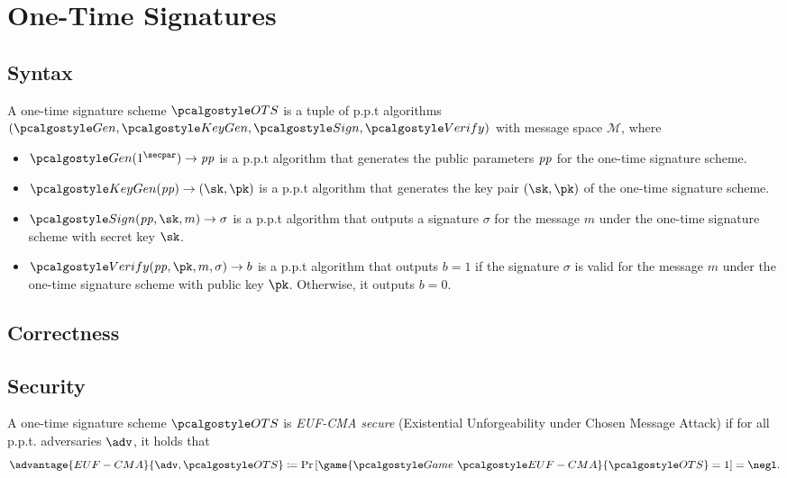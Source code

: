 \section{One-Time Signatures}\label{sec:one-time-sigs}

\subsection{Syntax}

\begin{definition}
    A one-time signature scheme $\algo{OTS}$ is a tuple of p.p.t algorithms $(\algo{Gen}, \algo{KeyGen}, \algo{Sign}, \algo{Verify})$ with message space $\mathcal{M}$, where
    \begin{itemize}
        \item $\algo{Gen}(1^\secpar)\rightarrow \params$ is a p.p.t algorithm that generates the public parameters $\mathit{pp}$ for the one-time signature scheme.
        \item $\algo{KeyGen}(\params)\rightarrow (\sk, \pk)$ is a p.p.t algorithm that generates the key pair $(\sk, \pk)$ of the one-time signature scheme.
        \item $\algo{Sign}(\params, \sk, m) \rightarrow \sigma$ is a p.p.t algorithm that outputs a signature $\sigma$ for the message $m$ under the one-time signature scheme with secret key $\sk$.
        \item $\algo{Verify}(\params, \pk, m, \sigma) \rightarrow b$ is a p.p.t algorithm that outputs $b = 1$ if the signature $\sigma$ is valid for the message $m$ under the one-time signature scheme with public key $\pk$. Otherwise, it outputs $b = 0$.
    \end{itemize}
\end{definition}


\subsection{Correctness}

\subsection{Security}

\begin{definition}\label{def:euf-cma-ot}
    A one-time signature scheme $\algo{OTS}$ is \emph{EUF-CMA secure} (Existential Unforgeability under Chosen Message Attack) if for all p.p.t. adversaries $\adv$, it holds that
    \[
    \advantage{EUF-CMA}{\adv, \algo{OTS}} \defeq \pr{\game{\Game~\algo{EUF-CMA}}{\algo{OTS}} = 1} = \negl.
    \]
\end{definition}

